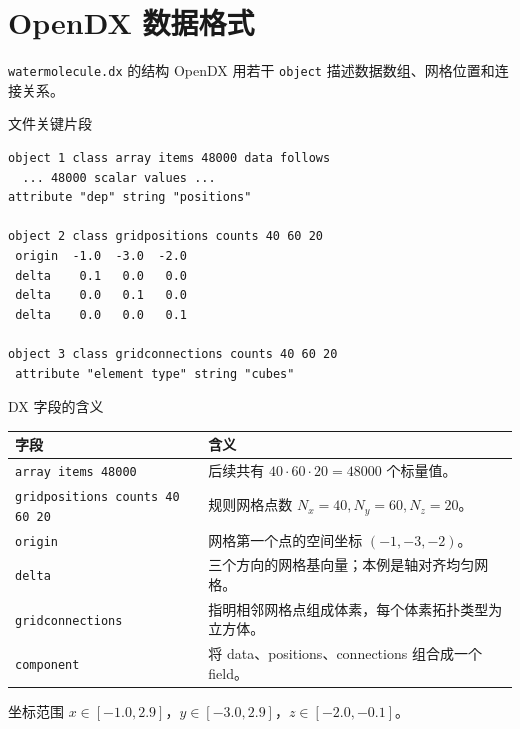 \documentclass[aspectratio=169,11pt]{ctexbeamer}
\begin{document}
\section{OpenDX 数据格式}

\begin{frame}[fragile]{\texttt{watermolecule.dx} 的结构}
  OpenDX 用若干 \texttt{object} 描述数据数组、网格位置和连接关系。

  \begin{block}{文件关键片段}
\begin{Verbatim}[fontsize=\scriptsize]
object 1 class array items 48000 data follows
  ... 48000 scalar values ...
attribute "dep" string "positions"

object 2 class gridpositions counts 40 60 20
 origin  -1.0  -3.0  -2.0
 delta    0.1   0.0   0.0
 delta    0.0   0.1   0.0
 delta    0.0   0.0   0.1

object 3 class gridconnections counts 40 60 20
 attribute "element type" string "cubes"
\end{Verbatim}
  \end{block}
\end{frame}

\begin{frame}{DX 字段的含义}
  \footnotesize
  \begin{table}
    \centering
    \begin{tabularx}{0.94\linewidth}{lX}
      \toprule
      字段 & 含义 \\
      \midrule
      \texttt{array items 48000} & 后续共有 $40\cdot60\cdot20=48000$ 个标量值。 \\
      \texttt{gridpositions counts 40 60 20} & 规则网格点数 $N_x=40,N_y=60,N_z=20$。 \\
      \texttt{origin} & 网格第一个点的空间坐标 $(-1,-3,-2)$。 \\
      \texttt{delta} & 三个方向的网格基向量；本例是轴对齐均匀网格。 \\
      \texttt{gridconnections} & 指明相邻网格点组成体素，每个体素拓扑类型为立方体。 \\
      \texttt{component} & 将 data、positions、connections 组合成一个 field。 \\
      \bottomrule
    \end{tabularx}
  \end{table}

  \begin{block}{坐标范围}
    $x\in[-1.0,2.9]$，$y\in[-3.0,2.9]$，$z\in[-2.0,-0.1]$。
  \end{block}
\end{frame}
\end{document}
